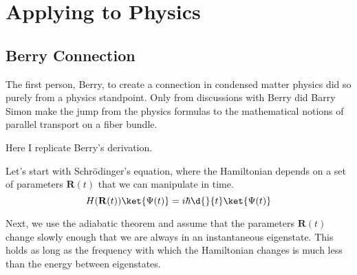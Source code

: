 \chapter{Applying to Physics}
\section{Berry Connection}

The first person, Berry, to create a connection in condensed matter physics did so purely from a physics standpoint.  Only from discussions with Berry did Barry Simon make the jump from the physics formulas to the mathematical notions of parallel transport on a fiber bundle.

Here I replicate Berry's derivation.

Let's start with Schr\"odinger's equation, where the Hamiltonian depends on a set of parameters $\mathbf{R}(t)$ that we can manipulate in time.
\begin{equation}
  H(\mathbf{R}(t))\ket{\Psi(t)} = i \hbar \d{}{t}\ket{\Psi(t)}
\end{equation}

Next, we use the adiabatic theorem and assume that the parameters $\mathbf{R}(t)$ change slowly enough that we are always in an instantaneous eigenstate.  This holds as long as the frequency with which the Hamiltonian changes is much less than the energy between eigenstates.

